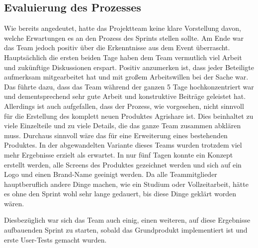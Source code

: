 \subsection*{Evaluierung des Prozesses}
Wie bereits angedeutet, hatte das Projektteam keine klare Vorstellung davon, welche Erwartungen es an den Prozess des Sprints stellen sollte. Am Ende war das Team jedoch positiv über die Erkenntnisse aus dem Event überrascht. Hauptsächlich die ersten beiden Tage haben dem Team vermutlich viel Arbeit und zukünftige Diskussionen erspart. Positiv anzumerken ist, dass jeder Beteiligte aufmerksam mitgearbeitet hat und mit großem Arbeitswillen bei der Sache war. Das führte dazu, dass das Team während der ganzen 5 Tage hochkonzentriert war und dementsprechend sehr gute Arbeit und konstruktive Beiträge geleistet hat. Allerdings ist auch aufgefallen, dass der Prozess, wie vorgesehen, nicht sinnvoll für die Erstellung des komplett neuen Produktes Agrishare ist. Dies beinhaltet zu viele Einzelteile und zu viele Details, die das ganze Team zusammen abklären muss. Durchaus sinnvoll wäre das für eine Erweiterung eines bestehenden Produktes. In der abgewandelten Variante dieses Teams wurden trotzdem viel mehr Ergebnisse erzielt als erwartet. In nur fünf Tagen konnte ein Konzept erstellt werden, alle Screens des Produktes gezeichnet werden und sich auf ein Logo und einen Brand-Name geeinigt werden. Da alle Teammitglieder hauptberuflich andere Dinge machen, wie ein Studium oder Vollzeitarbeit, hätte es ohne den Sprint wohl sehr lange gedauert, bis diese Dinge geklärt worden wären.

Diesbezüglich war sich das Team auch einig, einen weiteren, auf diese Ergebnisse aufbauenden Sprint zu starten, sobald das Grundprodukt implementiert ist und erste User-Tests gemacht wurden.

